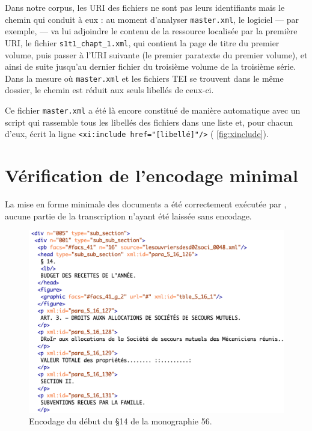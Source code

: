 Dans notre corpus, les URI des fichiers ne sont pas leurs identifiants mais le chemin qui conduit à eux : au moment d'analyser \texttt{master.xml}, le logiciel --- par exemple, \oxygen{} --- va lui adjoindre le contenu de la ressource localisée par la première URI, \cad{} le fichier \texttt{s1t1\_chapt\_1.xml}, qui contient la page de titre du premier volume, puis passer à l'URI suivante (le premier paratexte du premier volume), et ainsi de suite jusqu'au dernier fichier du troisième volume de la troisième série. Dans la mesure où \texttt{master.xml} et les fichiers TEI se trouvent dans le même dossier, le chemin est réduit aux seuls libellés de ceux-ci.

Ce fichier \texttt{master.xml} a été là encore constitué de manière automatique avec un script qui rassemble tous les libellés des fichiers dans une liste et, pour chacun d'eux, écrit la ligne \texttt{<xi:include href="[libellé]"/>} (\fig{} \ref{fig:xinclude}).

\section{Vérification de l'encodage minimal}

La mise en forme minimale des documents a été correctement exécutée par \lse, aucune partie de la transcription n'ayant été laissée sans encodage.

\begin{figure}[ht]
    \centering
    \includegraphics[width=15cm]{img/table_s2t2_chapt_5.png}
    \caption{Encodage du début du §14 de la monographie 56.}
    \label{fig:tableodm56xml}
\end{figure}

